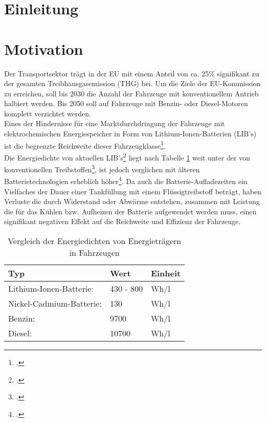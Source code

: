 \section{Einleitung}\label{sec:Einleitung}
%

\newpage
\section{Motivation}\label{sec:Motivation}

Der Transportsektor trägt in der EU mit einem Anteil von ca. 25\% signifikant zu der gesamten Treibhausgasemission (THG) bei. Um die Ziele der EU-Kommission zu erreichen, soll bis 2030 die Anzahl der Fahrzeuge mit konventionellem Antrieb halbiert werden. Bis 2050 soll auf Fahrzeuge mit Benzin- oder Diesel-Motoren komplett verzichtet werden. \\
Eines der Hindernisse für eine Marktdurchdringung der Fahrzeuge mit elektrochemischen Energiespeicher in Form von Lithium-Ionen-Batterien (LIB's) ist die begrenzte Reichweite dieser Fahrzeugklasse\footcite[Vgl.][S.136-146]{Ajanovic2020}.\\
Die Energiedichte von aktuellen LIB's\footcite[Vgl.][S. 11]{Hettesheimer2017} liegt nach Tabelle \ref{tab:Energiedichten} weit unter der von konventionellen Treibstoffen\footcite[Vgl.][]{BeloitEDU2021}, ist jedoch verglichen mit älteren Batterietechnologien erheblich höher\footcite[Vgl.][]{Sollmann2018}. Da auch die Batterie-Aufladezeiten ein Vielfaches der Dauer einer Tankfüllung mit einem Flüssigtreibstoff beträgt, haben Verluste die durch Widerstand oder Abwärme entstehen, zusammen mit Leistung die für das Kühlen bzw. Aufheizen der Batterie aufgewendet werden muss, einen signifikant negativen Effekt auf die Reichweite und Effizienz der Fahrzeuge.\\

\begin{table}[H]
	\caption{Vergleich der Energiedichten von Energieträgern in Fahrzeugen}
	\label{tab:Energiedichten}
	\vspace{0.2cm}	
	\begin{tabularx}{\textwidth}{ |X|X|X|  }
		\toprule[1.5pt]
		\textbf{Typ} & \textbf{Wert} & \textbf{Einheit} \\
		\hline\hline
		Lithium-Ionen-Batterie: & 430 - 800 & Wh/l \\
		\hline
		Nickel-Cadmium-Batterie: & 130 & Wh/l \\
		\hline
		Benzin: & 9700 & Wh/l \\
		\hline
		Diesel: & 10700 & Wh/l \\
		\bottomrule[1.5pt]
	\end{tabularx}		
\end{table}

